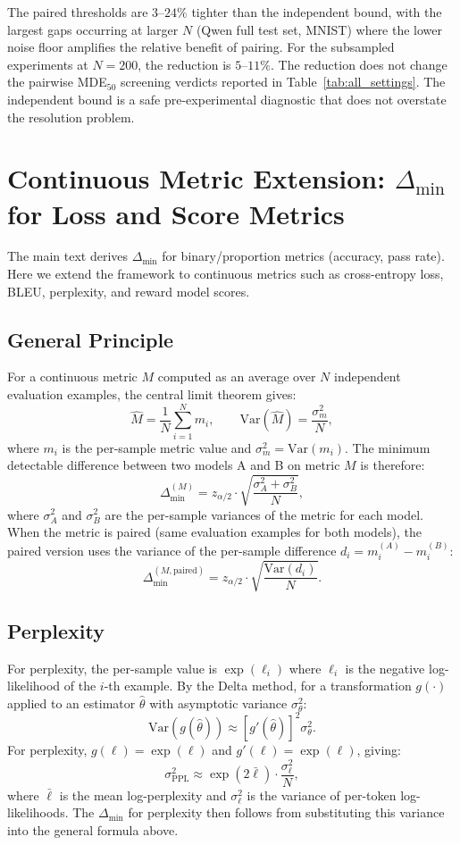 \documentclass[pdflatex,sn-mathphys-ay,iicol]{sn-jnl}
\theoremstyle{thmstylethree}
\begin{document}
\begin{table}[t]
\begin{table}[t]
The paired thresholds are $3$--$24\%$ tighter than the independent bound, with the largest gaps occurring at larger $N$ (Qwen full test set, MNIST) where the lower noise floor amplifies the relative benefit of pairing. For the subsampled experiments at $N=200$, the reduction is $5$--$11\%$. The reduction does not change the pairwise MDE$_{50}$ screening verdicts reported in Table~\ref{tab:all_settings}. The independent bound is a safe pre-experimental diagnostic that does not overstate the resolution problem.

\section{Continuous Metric Extension: $\Delta_{\min}$ for Loss and Score Metrics}\label{app:continuous}

The main text derives $\Delta_{\min}$ for binary/proportion metrics (accuracy, pass rate). Here we extend the framework to continuous metrics such as cross-entropy loss, BLEU, perplexity, and reward model scores.

\subsection{General Principle}

For a continuous metric $M$ computed as an average over $N$ independent evaluation examples, the central limit theorem gives:
\[
\hat M = \frac{1}{N}\sum_{i=1}^N m_i, \qquad \mathrm{Var}(\hat M) = \frac{\sigma_m^2}{N},
\]
where $m_i$ is the per-sample metric value and $\sigma_m^2 = \mathrm{Var}(m_i)$. The minimum detectable difference between two models A and B on metric $M$ is therefore:
\[
\Delta_{\min}^{(M)} = z_{\alpha/2} \cdot \sqrt{\frac{\sigma_A^2 + \sigma_B^2}{N}},
\]
where $\sigma_A^2$ and $\sigma_B^2$ are the per-sample variances of the metric for each model. When the metric is paired (same evaluation examples for both models), the paired version uses the variance of the per-sample difference $d_i = m_i^{(A)} - m_i^{(B)}$:
\[
\Delta_{\min}^{(M,\text{paired})} = z_{\alpha/2} \cdot \sqrt{\frac{\mathrm{Var}(d_i)}{N}}.
\]

\subsection{Perplexity}

For perplexity, the per-sample value is $\exp(\ell_i)$ where $\ell_i$ is the negative log-likelihood of the $i$-th example. By the Delta method, for a transformation $g(\cdot)$ applied to an estimator $\hat\theta$ with asymptotic variance $\sigma_\theta^2$:
\[
\mathrm{Var}(g(\hat\theta)) \approx [g'(\hat\theta)]^2 \sigma_\theta^2.
\]
For perplexity, $g(\ell) = \exp(\ell)$ and $g'(\ell) = \exp(\ell)$, giving:
\[
\sigma_{\text{PPL}}^2 \approx \exp(2\bar\ell) \cdot \frac{\sigma_\ell^2}{N},
\]
where $\bar\ell$ is the mean log-perplexity and $\sigma_\ell^2$ is the variance of per-token log-likelihoods. The $\Delta_{\min}$ for perplexity then follows from substituting this variance into the general formula above.


\end{table}
\end{table}
\end{document}
